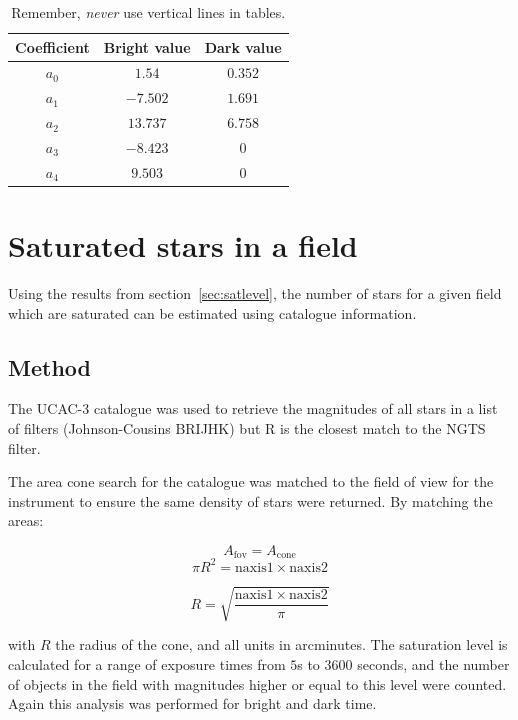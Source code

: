 \documentclass[a4paper]{report}
\begin{document}
\begin{table}[htbp]
   \centering
   \begin{tabular}{@{} ccc @{}} %
      \toprule
      Coefficient & Bright value & Dark value \\
            \midrule
	$a_{0}$ & $1.54$ & $0.352$ \\
      $a_{1}$ & $-7.502$ & $1.691$ \\
      $a_{2}$ & $13.737$ & $6.758$ \\
      $a_{3}$ & $-8.423$ & $0$ \\      
      $a_{4}$ & $9.503$ & $0$ \\
      \bottomrule
   \end{tabular}
   \caption{Remember, \emph{never} use vertical lines in tables.}
   \label{tab:coeffs}
\end{table}

\section{Saturated stars in a field}

Using the results from section~\ref{sec:satlevel}, the number of stars
for a given field which are saturated can be estimated using catalogue
information. 

\subsection{Method}

The UCAC-3 catalogue was used to retrieve the magnitudes of all stars
in a list of filters (Johnson-Cousins BRIJHK) but R is the closest match 
to the NGTS filter. 

The area cone search for the catalogue was matched to the field of view
for the instrument to ensure the same density of stars were returned. By
matching the areas:

\[
    A_{\mathrm{fov}} = A_{\mathrm{cone}}
    \]
\[
    \pi R^2 = \mathrm{naxis1} \times \mathrm{naxis2}
    \]

\[
    R = \sqrt{\frac{\mathrm{naxis1} \times \mathrm{naxis2}}{\pi}}
    \]

with $R$ the radius of the cone, and all units in arcminutes. The
saturation level is calculated for a range of exposure times from $5$s
to $3600$ seconds, and the number of objects in the field with
magnitudes higher or equal to this level were counted. Again this
analysis was performed for bright and dark time.
\end{document}
